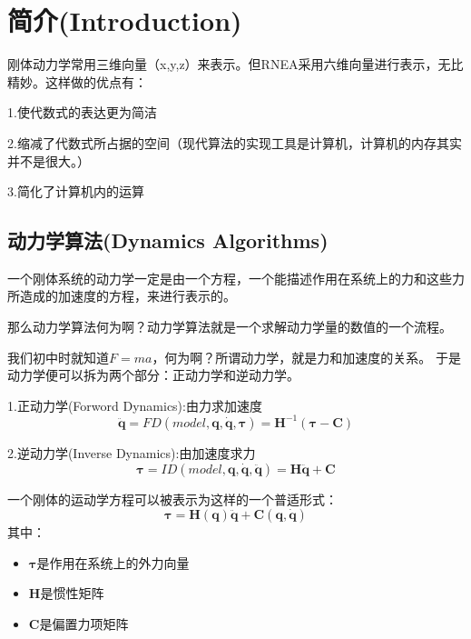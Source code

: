 \chapter{简介(Introduction)}
刚体动力学常用三维向量（x,y,z）来表示。但RNEA采用六维向量进行表示，无比精妙。这样做的优点有：
\par 1.使代数式的表达更为简洁
\par 2.缩减了代数式所占据的空间（现代算法的实现工具是计算机，计算机的内存其实并不是很大。）
\par 3.简化了计算机内的运算
\section{动力学算法(Dynamics Algorithms)}
一个刚体系统的动力学一定是由一个方程，一个能描述作用在系统上的力和这些力所造成的加速度的方程，来进行表示的。
\par 那么动力学算法何为啊？动力学算法就是一个求解动力学量的数值的一个流程。
\par 我们初中时就知道$F=ma$，何为啊？所谓动力学，就是力和加速度的关系。
于是动力学便可以拆为两个部分：正动力学和逆动力学。
\par 1.正动力学(Forword Dynamics):由力求加速度
$$\ddot{\mathbf{q}}=FD(model,\mathbf{q}, \dot{\mathbf{q}},\boldsymbol{\tau})=\mathbf{H}^{-1}(\boldsymbol{\tau}-\mathbf{C})$$
\par 2.逆动力学(Inverse Dynamics):由加速度求力
$$\boldsymbol{\tau}=ID(model,\mathbf{q}, \dot{\mathbf{q}},\ddot{\mathbf{q}})=\mathbf{H}\ddot{\mathbf{q}}+\mathbf{C}$$
\par 一个刚体的运动学方程可以被表示为这样的一个普适形式：
$$\boldsymbol{\tau} = \mathbf{H}(\mathbf{q})\ddot{\mathbf{q}} + \mathbf{C}(\mathbf{q}, \dot{\mathbf{q}})$$
其中：\begin{itemize}
    \item $\boldsymbol{\tau}$是作用在系统上的外力向量
    \item $\mathbf{H}$是惯性矩阵
    \item $\mathbf{C}$是偏置力项矩阵
\end{itemize}


